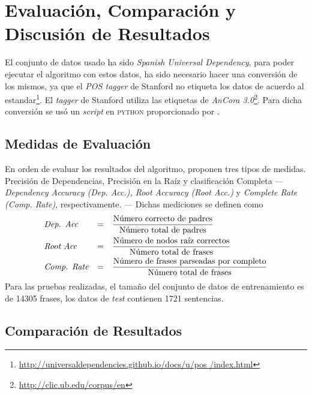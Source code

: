 \chapter{Evaluación, Comparación y Discusión de Resultados}
\label{ch:eval}

El conjunto de datos usado ha sido \emph{Spanish Universal Dependency}, para
poder ejecutar el algoritmo con estos datos, ha sido necesario hacer una
conversión de los mismos, ya que el \emph{\ac{POS} tagger} de Stanford no
etiqueta los datos de acuerdo al
estandar\footnote{\url{http://universaldependencies.github.io/docs/u/pos
    /index.html}}. El \emph{tagger} de Stanford utiliza las etiquetas de
\emph{AnCora 3.0}\footnote{\url{http://clic.ub.edu/corpus/en}}. Para dicha
conversión se usó un \emph{script} en \textsc{python} proporcionado por
\citeauthor{rohit2016} \cite{rohit2016}.

\section{Medidas de Evaluación}
\label{sec:eval}

En orden de evaluar los resultados del algoritmo, \citeauthor{yamada2003}
proponen tres tipos de medidas. Precisión de Dependencias, Precisión en la Raíz
y clasificación Completa --- \emph{Dependency Accuracy (Dep. Acc.), Root
  Accuracy (Root Acc.)} y \emph{Complete Rate (Comp. Rate)},
respectivamente. --- Dichas mediciones se definen como
\begin{equation*}
  \begin{aligned}
    & \text{\emph{Dep. Acc}} &=& \quad\frac{\text{Número correcto de padres}}{\text{Número
        total de padres}} \\
    & \text{\emph{Root Acc}} &=& \quad\frac{\text{Número de nodos raíz correctos}}{\text{Número
        total de frases}} \\
    & \text{\emph{Comp. Rate}} &=& \quad\frac{\text{Número de frases
        parseadas por completo}}{\text{Número total de frases}} 
  \end{aligned}
\end{equation*}
Para las pruebas realizadas, el tamaño del conjunto de datos de entrenamiento es
de 14305 frases, los datos de \emph{test} contienen 1721 sentencias.

\section{Comparación de Resultados}
\label{sec:results}

